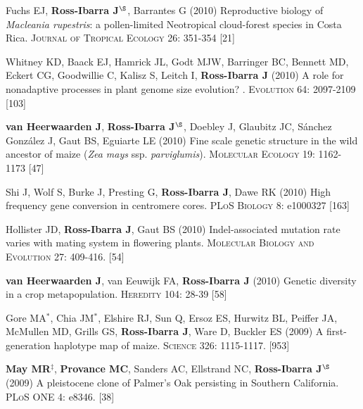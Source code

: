 \documentclass[letterpaper,10pt]{article}
\begin{document}
\begin{etaremune}
\item Fuchs EJ, {\bf Ross-Ibarra J}$^\S$, Barrantes G (2010) Reproductive biology of \emph{Macleania rupestris}: a pollen-limited Neotropical cloud-forest species in Costa Rica.  \textsc{Journal of Tropical Ecology} 26: 351-354
{} [21]\\


\item Whitney KD, Baack EJ, Hamrick JL, Godt MJW, Barringer BC, Bennett MD, Eckert CG, Goodwillie C, Kalisz S, Leitch I, {\bf Ross-Ibarra J} (2010) A role for nonadaptive processes in plant genome size evolution? . \textsc{Evolution} 64: 2097-2109
{} [103]\\


\item {\bf van Heerwaarden J}, {\bf Ross-Ibarra J}$^\S$, Doebley J, Glaubitz JC, S\'{a}nchez Gonz\'{a}lez J, Gaut BS, Eguiarte LE (2010) Fine scale genetic structure in the wild ancestor of maize (\emph{Zea mays} ssp. \emph{parviglumis}).  \textsc{Molecular Ecology} 19: 1162-1173
{} [47]\\


\item Shi J, Wolf S, Burke J, Presting G, {\bf Ross-Ibarra J}, Dawe RK (2010) High frequency gene conversion in centromere cores.  \textsc{PLoS Biology} 8: e1000327
{} [163]\\


\item Hollister JD, {\bf Ross-Ibarra J}, Gaut BS (2010) Indel-associated mutation rate varies with mating system in flowering plants.  \textsc{Molecular Biology and Evolution} 27: 409-416.
{} [54]\\

\item {\bf van Heerwaarden J}, van Eeuwijk FA, {\bf Ross-Ibarra J} (2010) Genetic diversity in a crop metapopulation.  \textsc{Heredity} 104: 28-39
{} [58]\\


\item Gore MA$^*$, Chia JM$^*$, Elshire RJ, Sun Q, Ersoz ES, Hurwitz BL, Peiffer JA, McMullen MD, Grills GS, {\bf Ross-Ibarra J}, Ware D, Buckler ES (2009) A first-generation haplotype map of maize.  \textsc{Science 326}: 1115-1117.
{} [953]\\


\item {\bf May MR}$^\ddagger$, {\bf Provance MC}, Sanders AC, Ellstrand NC, {\bf Ross-Ibarra J}$^\S$ (2009) A pleistocene clone of Palmer's Oak persisting in Southern California.  \textsc{PLoS ONE} 4: e8346.
{} [38]\\



\end{etaremune}
\end{document}
